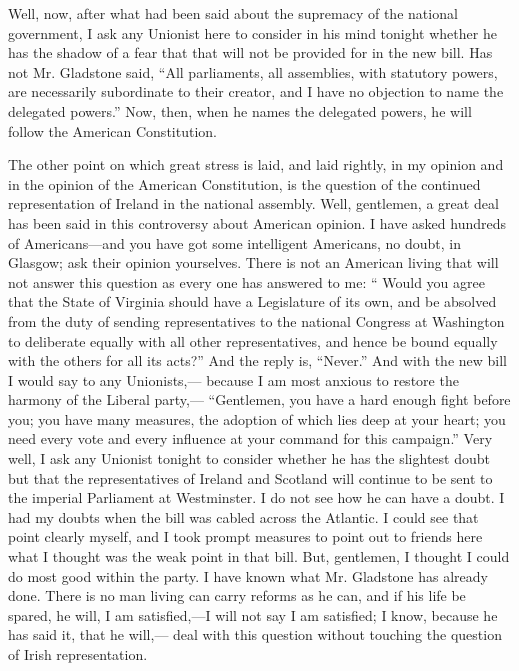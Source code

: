 \documentclass[11pt,openany]{book}
\begin{document}
Well, now, after what had been said about the supremacy of the national government, I ask any Unionist here to consider in his mind tonight whether he has the shadow of a fear that that will not be provided for in the new bill. Has not Mr. Gladstone said, ``All parliaments, all assemblies, with statutory powers, are necessarily subordinate to their creator, and I have no objection to name the delegated powers.'' Now, then, when he names the delegated powers, he will follow the American Constitution.

The other point on which great stress is laid, and laid rightly, in my opinion and in the opinion of the American Constitution, is the question of the continued representation of Ireland in the national assembly. Well, gentlemen, a great deal has been said in this controversy about American opinion. I have asked hundreds of Americans---and you have got some intelligent Americans, no doubt, in Glasgow; ask their opinion yourselves. There is not an American living that will not answer this question as every one has answered to me: `` Would you agree that the State of Virginia should have a Legislature of its own, and be absolved from the duty of sending representatives to the national Congress at Washington to deliberate equally with all other representatives, and hence be bound equally with the others for all its acts?'' And the reply is, ``Never.'' And with the new bill I would say to any Unionists,--- because I am most anxious to restore the harmony of the Liberal party,--- ``Gentlemen, you have a hard enough fight before you; you have many measures, the adoption of which lies deep at your heart; you need every vote and every influence at your command for this campaign.'' Very well, I ask any Unionist tonight to consider whether he has the slightest doubt but that the representatives of Ireland and Scotland will continue to be sent to the imperial Parliament at Westminster. I do not see how he can have a doubt. I had my doubts when the bill was cabled across the Atlantic. I could see that point clearly myself, and I took prompt measures to point out to friends here what I thought was the weak point in that bill. But, gentlemen, I thought I could do most good within the party. I have known what Mr. Gladstone has already done. There is no man living can carry reforms as he can, and if his life be spared, he will, I am satisfied,---I will not say I am satisfied; I know, because he has said it, that he will,--- deal with this question without touching the question of Irish representation.
\end{document}
